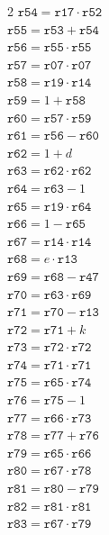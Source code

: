 \documentclass[10pt]{article}
\begin{document}
\begin{multicols}{2}
\(\mathtt{r54} = \mathtt{r17} \cdot \mathtt{r52}\)\\
\(\mathtt{r55} = \mathtt{r53} + \mathtt{r54}\)\\
\(\mathtt{r56} = \mathtt{r55} \cdot \mathtt{r55}\)\\
\(\mathtt{r57} = \mathtt{r07} \cdot \mathtt{r07}\)\\
\(\mathtt{r58} = \mathtt{r19} \cdot \mathtt{r14}\)\\
\(\mathtt{r59} = 1 + \mathtt{r58}\)\\
\(\mathtt{r60} = \mathtt{r57} \cdot \mathtt{r59}\)\\
\(\mathtt{r61} = \mathtt{r56} - \mathtt{r60}\)\\
\(\mathtt{r62} = 1 + d\)\\
\(\mathtt{r63} = \mathtt{r62} \cdot \mathtt{r62}\)\\
\(\mathtt{r64} = \mathtt{r63} - 1\)\\
\(\mathtt{r65} = \mathtt{r19} \cdot \mathtt{r64}\)\\
\(\mathtt{r66} = 1 - \mathtt{r65}\)\\
\(\mathtt{r67} = \mathtt{r14} \cdot \mathtt{r14}\)\\
\(\mathtt{r68} = e \cdot \mathtt{r13}\)\\
\(\mathtt{r69} = \mathtt{r68} - \mathtt{r47}\)\\
\(\mathtt{r70} = \mathtt{r63} \cdot \mathtt{r69}\)\\
\(\mathtt{r71} = \mathtt{r70} - \mathtt{r13}\)\\
\(\mathtt{r72} = \mathtt{r71} + k\)\\
\(\mathtt{r73} = \mathtt{r72} \cdot \mathtt{r72}\)\\
\(\mathtt{r74} = \mathtt{r71} \cdot \mathtt{r71}\)\\
\(\mathtt{r75} = \mathtt{r65} \cdot \mathtt{r74}\)\\
\(\mathtt{r76} = \mathtt{r75} - 1\)\\
\(\mathtt{r77} = \mathtt{r66} \cdot \mathtt{r73}\)\\
\(\mathtt{r78} = \mathtt{r77} + \mathtt{r76}\)\\
\(\mathtt{r79} = \mathtt{r65} \cdot \mathtt{r66}\)\\
\(\mathtt{r80} = \mathtt{r67} \cdot \mathtt{r78}\)\\
\(\mathtt{r81} = \mathtt{r80} - \mathtt{r79}\)\\
\(\mathtt{r82} = \mathtt{r81} \cdot \mathtt{r81}\)\\
\(\mathtt{r83} = \mathtt{r67} \cdot \mathtt{r79}\)\\

\end{multicols}
\end{document}
